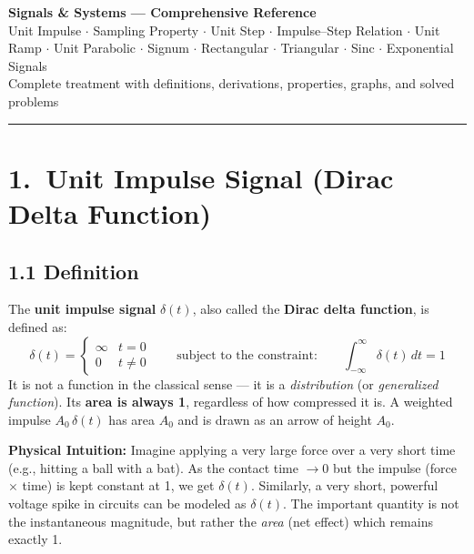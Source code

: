 \documentclass[10pt,a4paper]{article}
\newcommand{\Int}{\displaystyle\int_{-\infty}^{\infty}}
\begin{document}
\begin{center}
  {\LARGE\bfseries\color{headcolor} Signals \& Systems --- Comprehensive Reference}\\[4pt]
  {\normalsize\color{darkgreen}
    Unit Impulse $\cdot$ Sampling Property $\cdot$ Unit Step $\cdot$ Impulse--Step Relation
    $\cdot$ Unit Ramp $\cdot$ Unit Parabolic $\cdot$ Signum $\cdot$ Rectangular
    $\cdot$ Triangular $\cdot$ Sinc $\cdot$ Exponential Signals}\\[2pt]
  {\small\color{gray} Complete treatment with definitions, derivations, properties, graphs, and solved problems}
\end{center}
\vspace{2pt}
{\color{darkgreen}\rule{\linewidth}{1.5pt}}
\vspace{4pt}

\section{1.\ Unit Impulse Signal (Dirac Delta Function)}

\subsection*{1.1 Definition}

\begin{defbox}
The \textbf{unit impulse signal} $\delta(t)$, also called the \textbf{Dirac delta function}, is defined as:
\[
  \delta(t) = \begin{cases} \infty & t = 0 \\ 0 & t \neq 0 \end{cases}
  \qquad \text{subject to the constraint:} \qquad
  \Int \delta(t)\,dt = 1
\]
It is not a function in the classical sense --- it is a \emph{distribution} (or \emph{generalized function}).
Its \textbf{area is always 1}, regardless of how compressed it is.
A weighted impulse $A_0\,\delta(t)$ has area $A_0$ and is drawn as an arrow of height $A_0$.
\end{defbox}

\begin{intuitbox}
\textbf{Physical Intuition:} Imagine applying a very large force over a very short time (e.g., hitting a ball with a bat). As the contact time $\to 0$ but the impulse (force $\times$ time) is kept constant at 1, we get $\delta(t)$. Similarly, a very short, powerful voltage spike in circuits can be modeled as $\delta(t)$. The important quantity is not the instantaneous magnitude, but rather the \textit{area} (net effect) which remains exactly 1.
\end{intuitbox}
\end{document}
